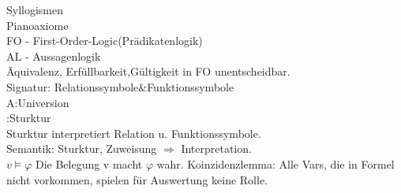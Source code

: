 Syllogismen\\
Pianoaxiome\\

FO - First-Order-Logic(Prädikatenlogik)\\
AL - Aussagenlogik\\
Äquivalenz, Erfüllbarkeit,Gültigkeit in FO unentscheidbar.\\
Signatur: Relationssymbole\&Funktionssymbole\\
A:Universion\\
\Afrak:Sturktur\\
Sturktur interpretiert Relation u. Funktionssymbole.\\
Semantik: Sturktur, Zuweisung $\Rightarrow$ Interpretation.\\
$v \models \varphi$ Die Belegung v macht $\varphi$ wahr.
Koinzidenzlemma: Alle Vars, die in Formel nicht vorkommen, spielen für Auswertung keine Rolle.
